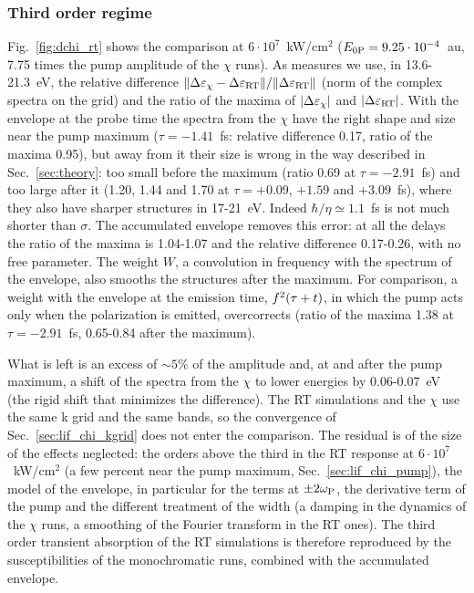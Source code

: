 \documentclass[10pt,a4paper]{paper}
\begin{document}
\subsubsection{Third order regime}
\label{sec:lif_dchi_third}

Fig.~\ref{fig:dchi_rt} shows the comparison at $6\cdot10^7$~kW/cm$^2$ ($E_{0\mathrm{P}} = 9.25\cdot10^{-4}$~au, 7.75 times the
pump amplitude of the $\chi$ runs). As measures we use, in 13.6-21.3~eV, the relative difference
$\|\Delta\varepsilon_\chi-\Delta\varepsilon_{\mathrm{RT}}\|/\|\Delta\varepsilon_{\mathrm{RT}}\|$ (norm of the complex spectra on the grid) and the ratio of
the maxima of $|\Delta\varepsilon_\chi|$ and $|\Delta\varepsilon_{\mathrm{RT}}|$. With the envelope at the probe time the spectra from the
$\chi$ have the right shape and size near the pump maximum ($\tau = -1.41$~fs: relative difference 0.17, ratio of the
maxima 0.95), but away from it their size is wrong in the way described in Sec.~\ref{sec:theory}: too small before
the maximum (ratio 0.69 at $\tau = -2.91$~fs) and too large after it (1.20, 1.44 and 1.70 at $\tau = +0.09$, $+1.59$
and $+3.09$~fs), where they also have sharper structures in 17-21~eV. Indeed $\hbar/\eta\simeq1.1$~fs is not much
shorter than $\sigma$. The accumulated envelope removes this error: at all the delays the ratio of the maxima is
1.04-1.07 and the relative difference 0.17-0.26, with no free parameter. The weight $W$, a convolution in frequency
with the spectrum of the envelope, also smooths the structures after the maximum. For comparison, a weight with the
envelope at the emission time, $f^2(\tau+t)$, in which the pump acts only when the polarization is emitted,
overcorrects (ratio of the maxima 1.38 at $\tau = -2.91$~fs, 0.65-0.84 after the maximum).

What is left is an excess of $\sim5$\% of the amplitude and, at and after the pump maximum, a shift of the spectra
from the $\chi$ to lower energies by 0.06-0.07~eV (the rigid shift that minimizes the difference). The RT simulations
and the $\chi$ use the same k grid and the same bands, so the convergence of Sec.~\ref{sec:lif_chi_kgrid} does not
enter the comparison. The residual is of the size of the effects neglected: the orders above the third in the RT
response at $6\cdot10^7$~kW/cm$^2$ (a few percent near the pump maximum, Sec.~\ref{sec:lif_chi_pump}), the model of the
envelope, in particular for the terms at $\pm2\omega_{\mathrm{P}}$, the derivative term of the pump and the different treatment of the
width (a damping in the dynamics of the $\chi$ runs, a smoothing of the Fourier transform in the RT ones). The third
order transient absorption of the RT simulations is therefore reproduced by the susceptibilities of the
monochromatic runs, combined with the accumulated envelope.
\end{document}
